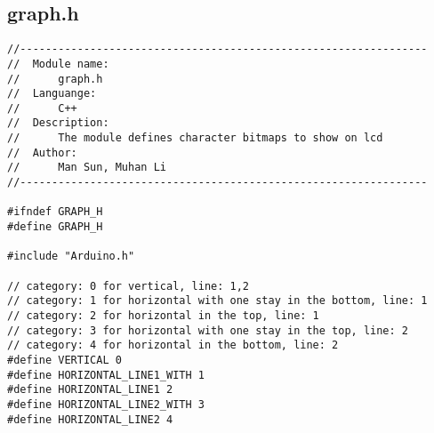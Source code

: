 \subsection{graph.h}
\begin{verbatim}
//----------------------------------------------------------------
//  Module name:
//      graph.h
//  Languange:
//      C++
//  Description:
//      The module defines character bitmaps to show on lcd
//  Author:
//      Man Sun, Muhan Li
//----------------------------------------------------------------

#ifndef GRAPH_H
#define GRAPH_H

#include "Arduino.h"

// category: 0 for vertical, line: 1,2
// category: 1 for horizontal with one stay in the bottom, line: 1
// category: 2 for horizontal in the top, line: 1
// category: 3 for horizontal with one stay in the top, line: 2
// category: 4 for horizontal in the bottom, line: 2
#define VERTICAL 0
#define HORIZONTAL_LINE1_WITH 1
#define HORIZONTAL_LINE1 2
#define HORIZONTAL_LINE2_WITH 3
#define HORIZONTAL_LINE2 4


\end{verbatim}
